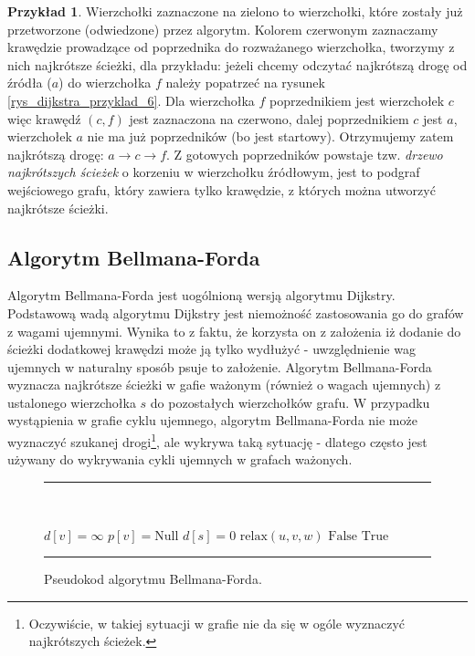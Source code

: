 \documentclass[12pt,a4paper]{book}
\newenvironment{myalgorithm}
{\rule{\textwidth}{0.5mm}\\\SetAlCapSty{}\SetAlgoNoEnd\SetAlgoNoLine\begin{algorithm}}{\end{algorithm}\rule{\textwidth}{0.5mm}}
\theoremstyle{definition}
\newtheorem{ex}{Przykład}
\numberwithin{equation}{chapter}
\begin{document}
\begin{ex}
Wierzchołki zaznaczone na zielono to wierzchołki, które zostały już przetworzone (odwiedzone) przez algorytm. Kolorem czerwonym zaznaczamy krawędzie prowadzące od poprzednika do rozważanego wierzchołka, tworzymy z nich najkrótsze ścieżki, dla przykładu: jeżeli chcemy odczytać najkrótszą drogę od źródła ($a$) do wierzchołka $f$ należy popatrzeć na rysunek \ref{rys_dijkstra_przyklad_6}. Dla wierzchołka $f$ poprzednikiem jest wierzchołek $c$ więc krawędź $(c,f)$ jest zaznaczona na czerwono, dalej poprzednikiem $c$ jest $a$, wierzchołek $a$ nie ma już poprzedników (bo jest startowy). Otrzymujemy zatem najkrótszą drogę: $a \rightarrow c \rightarrow f$. Z gotowych poprzedników powstaje tzw. \textit{drzewo najkrótszych ścieżek} o korzeniu w wierzchołku źródłowym, jest to podgraf wejściowego grafu, który zawiera tylko krawędzie, z których można utworzyć najkrótsze ścieżki. 
\end{ex}

\subsection{Algorytm Bellmana-Forda}

Algorytm Bellmana-Forda jest uogólnioną wersją algorytmu Dijkstry. Podstawową wadą algorytmu Dijkstry jest niemożność zastosowania go do grafów z wagami ujemnymi. Wynika to z faktu, że korzysta on z założenia iż dodanie do ścieżki dodatkowej krawędzi może ją tylko wydłużyć - uwzględnienie wag ujemnych w naturalny sposób psuje to założenie. Algorytm Bellmana-Forda wyznacza najkrótsze ścieżki w gafie ważonym (również o wagach ujemnych) z ustalonego wierzchołka $s$ do pozostałych wierzchołków grafu. W przypadku wystąpienia w grafie cyklu ujemnego, algorytm Bellmana-Forda nie może wyznaczyć szukanej drogi\footnote{Oczywiście, w takiej sytuacji w grafie nie da się w ogóle wyznaczyć najkrótszych ścieżek.}, ale wykrywa taką sytuację - dlatego często jest używany do wykrywania cykli ujemnych w grafach ważonych. 

\begin{figure}[H]
\begin{myalgorithm}[H]
	\DontPrintSemicolon
	{
		{
			$d[v] = \infty $\;
			$p[v] = \mbox{Null} $\;		
		}
		$d[s] = 0$\;
		{
			{
				$\mbox{relax}(u, v, w)$\;
			}
		}
		{
			{
				\Return $\mbox{False}$\;
			}
		}
		\Return $\mbox{True}$ \;
	}
\end{myalgorithm}
\caption{Pseudokod algorytmu Bellmana-Forda.}
\label{Bellman_Ford_pseudokod}
\end{figure}
\end{document}
